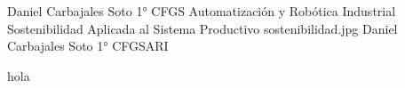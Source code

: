 \documentclass[spanish,openany]{report}
\date{\today}
\begin{document}
{Daniel Carbajales Soto}
{ 1° CFGS Automatización y Robótica Industrial\\
	Sostenibilidad Aplicada al Sistema Productivo}
{sostenibilidad.jpg}
\maketoc
{}
{Daniel Carbajales Soto}
{1° CFGSARI}
%





hola





\end{document}
